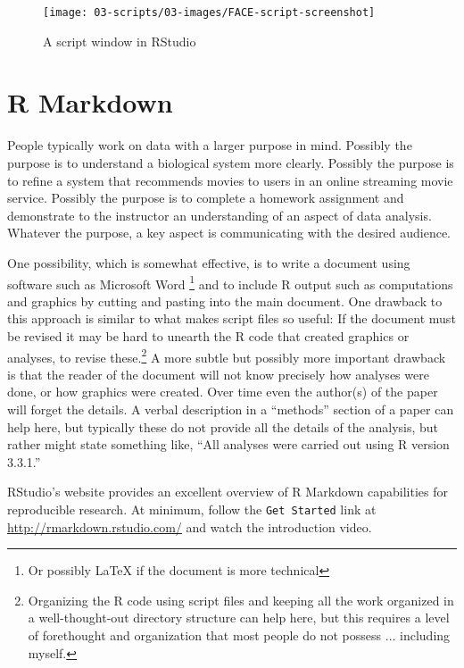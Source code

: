 \documentclass[]{krantz}
\theoremstyle{definition}
\theoremstyle{definition}
\theoremstyle{definition}
\theoremstyle{remark}
\begin{document}
\begin{figure}

{\centering \texttt{[image: 03-scripts/03-images/FACE-script-screenshot]} 

}

\caption{A script window in RStudio}\label{fig:script}
\end{figure}

\section{R Markdown}\label{r-markdown}

People typically work on data with a larger purpose in mind. Possibly
the purpose is to understand a biological system more clearly. Possibly
the purpose is to refine a system that recommends movies to users in an
online streaming movie service. Possibly the purpose is to complete a
homework assignment and demonstrate to the instructor an understanding
of an aspect of data analysis. Whatever the purpose, a key aspect is
communicating with the desired audience.

One possibility, which is somewhat effective, is to write a document
using software such as Microsoft Word \footnote{Or possibly LaTeX if the
  document is more technical} and to include R output such as
computations and graphics by cutting and pasting into the main document.
One drawback to this approach is similar to what makes script files so
useful: If the document must be revised it may be hard to unearth the R
code that created graphics or analyses, to revise these.\footnote{Organizing
  the R code using script files and keeping all the work organized in a
  well-thought-out directory structure can help here, but this requires
  a level of forethought and organization that most people do not
  possess \(\ldots\) including myself.} A more subtle but possibly more
important drawback is that the reader of the document will not know
precisely how analyses were done, or how graphics were created. Over
time even the author(s) of the paper will forget the details. A verbal
description in a ``methods'' section of a paper can help here, but
typically these do not provide all the details of the analysis, but
rather might state something like, ``All analyses were carried out using
R version 3.3.1.''

RStudio's website provides an excellent overview of R Markdown
capabilities for reproducible research. At minimum, follow the
\texttt{Get\ Started} link at \url{http://rmarkdown.rstudio.com/} and
watch the introduction video.
\end{document}
